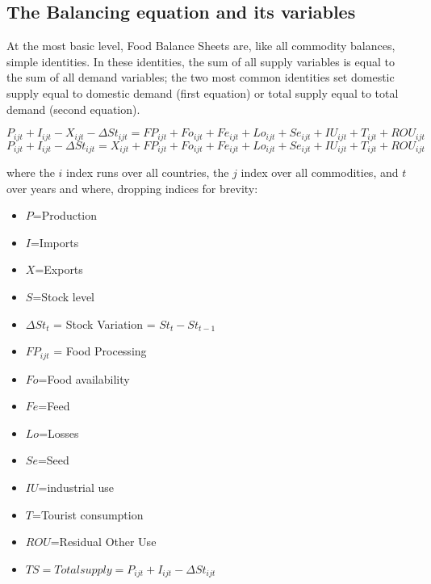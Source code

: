 \documentclass[]{article}
\providecommand{\tightlist}{%
  \setlength{\itemsep}{0pt}\setlength{\parskip}{0pt}}
\begin{document}
\subsection*{The Balancing equation and its
variables}\label{the-balancing-equation-and-its-variables}

At the most basic level, Food Balance Sheets are, like all commodity
balances, simple identities. In these identities, the sum of all supply
variables is equal to the sum of all demand variables; the two most
common identities set domestic supply equal to domestic demand (first
equation) or total supply equal to total demand (second equation).

\begin{equation}
\label{eq:balance1}
P_{ijt} + I_{ijt} - X_{ijt} - \Delta St_{ijt} = FP_{ijt} + Fo_{ijt} + Fe_{ijt} + Lo_{ijt} + Se_{ijt} + IU_{ijt} + T_{ijt}  + ROU_{ijt}
\end{equation}\begin{equation}
\label{eq:balance2}
P_{ijt} + I_{ijt} - \Delta St_{ijt} = X_{ijt} + FP_{ijt} + Fo_{ijt} + Fe_{ijt} + Lo_{ijt} + Se_{ijt} + IU_{ijt} + T_{ijt} + ROU_{ijt}
\end{equation}

where the \(i\) index runs over all countries, the \(j\) index over all
commodities, and \(t\) over years and where, dropping indices for
brevity:

\begin{itemize}
\tightlist
\item
  \(P\)=Production
\item
  \(I\)=Imports
\item
  \(X\)=Exports
\item
  \(S\)=Stock level
\item
  \(\Delta St_{t}\) = Stock Variation = \(St_{t} - St_{t-1}\)
\item
  \(FP_{ijt}\) = Food Processing
\item
  \(Fo\)=Food availability
\item
  \(Fe\)=Feed
\item
  \(Lo\)=Losses
\item
  \(Se\)=Seed
\item
  \(IU\)=industrial use
\item
  \(T\)=Tourist consumption
\item
  \(ROU\)=Residual Other Use
\item
  \(TS = Total supply = P_{ijt} + I_{ijt} - \Delta St_{ijt}\)
\end{itemize}
\end{document}
